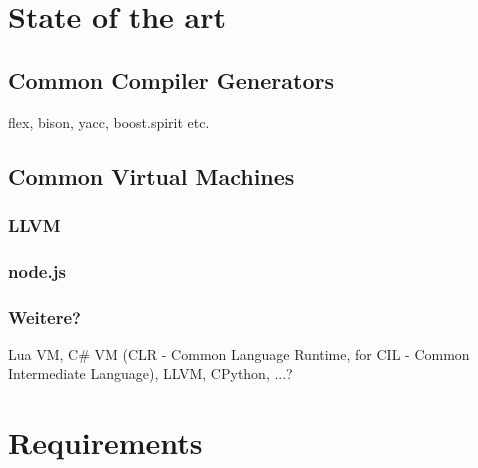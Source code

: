 
\chapter{State of the art}
        
        
    \section{Common Compiler Generators}
        flex, bison, yacc, boost.spirit etc.

    \section{Common Virtual Machines}
        
        
        \subsection{LLVM}
        
        \subsection{node.js}
        
        
        \subsection{Weitere?}
        
        Lua VM, C\# VM (CLR - Common Language Runtime, for CIL - Common Intermediate Language), LLVM, CPython, ...?

\chapter{Requirements}

	
